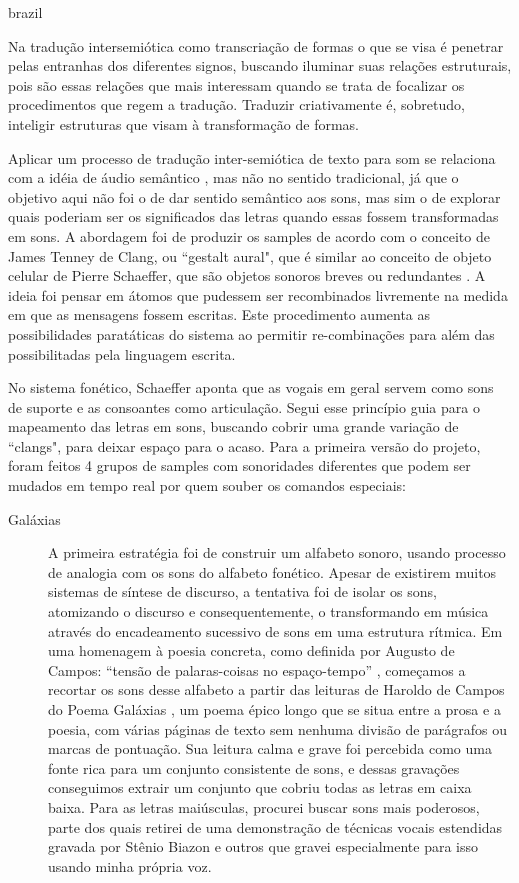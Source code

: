 \begin{otherlanguage*}{brazil}
\begin{citacao}
Na tradução intersemiótica como transcriação de formas o que se visa é penetrar pelas entranhas dos diferentes signos, buscando iluminar suas relações estruturais, pois são essas relações que mais interessam quando se trata de focalizar os procedimentos que regem a tradução. Traduzir criativamente é, sobretudo, inteligir estruturas que visam à transformação de formas. \cite[71]{JulioPlaza1969}
\end{citacao}

Aplicar um processo de tradução inter-semiótica de texto para som se relaciona com a idéia de áudio semântico \cite{Kostek:2010}, mas não no sentido tradicional, já que o objetivo aqui não foi o de dar sentido semântico aos sons, mas sim o de explorar quais poderiam ser os significados das letras quando essas fossem transformadas em sons. A abordagem foi de produzir os samples de acordo com o conceito de James Tenney \cite{Tenney1988} de Clang, ou ``gestalt aural", que é similar ao conceito de objeto celular de Pierre Schaeffer, que são objetos sonoros breves ou redundantes \cite{Chion1983}. A ideia foi pensar em átomos que pudessem ser recombinados livremente na medida em que as mensagens fossem escritas. Este procedimento aumenta as possibilidades paratáticas do sistema ao permitir re-combinações para além das possibilitadas pela linguagem escrita.


No sistema fonético, Schaeffer \cite{Schaeffer2007} aponta que as vogais em geral servem como sons de suporte e as consoantes como articulação. Segui esse princípio guia para o mapeamento das letras em sons, buscando cobrir uma grande variação de ``clangs", para deixar espaço para o acaso. Para a primeira versão do projeto, foram feitos 4 grupos de samples com sonoridades diferentes que podem ser mudados em tempo real por quem souber os comandos especiais: 

\begin{description}
 \item[Galáxias] A primeira estratégia foi de construir um alfabeto sonoro, usando processo de analogia com os sons do alfabeto fonético. Apesar de existirem muitos sistemas de síntese de discurso, a tentativa foi de isolar os sons, atomizando o discurso e consequentemente, o transformando em música através do encadeamento sucessivo de sons em uma estrutura rítmica. 
Em uma homenagem à poesia concreta, como definida por Augusto de Campos: ``tensão de palaras-coisas no espaço-tempo'' \cite[45]{campos_teoria_2014}, começamos a recortar os sons desse alfabeto a partir das leituras de Haroldo de Campos do Poema Galáxias \cite{Campos2004}, um poema épico longo que se situa entre a prosa e a poesia, com várias páginas de texto sem nenhuma divisão de parágrafos ou marcas de pontuação. Sua leitura calma e grave foi percebida como uma fonte rica para um conjunto consistente de sons, e dessas gravações conseguimos extrair um conjunto que cobriu todas as letras em caixa baixa. Para as letras maiúsculas, procurei buscar sons mais poderosos, parte dos quais retirei de uma demonstração de técnicas vocais estendidas gravada por Stênio Biazon e outros que gravei especialmente para isso usando minha própria voz.  


\end{description}
\end{otherlanguage*}

